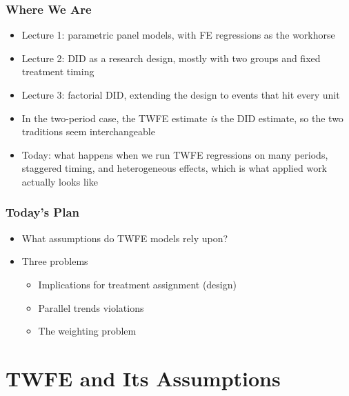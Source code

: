 \documentclass[xcolor=svgnames,9pt,english, aspectratio=169]{beamer}
\begin{document}
\begin{frame}
  \frametitle{Where We Are}
\begin{itemize}[<+->]\itemsep1em
\item Lecture 1: parametric panel models, with FE regressions as the workhorse
\item Lecture 2: DID as a research design, mostly with two groups and fixed treatment timing
\item Lecture 3: factorial DID, extending the design to events that hit every unit
\item In the two-period case, the TWFE estimate \emph{is} the DID estimate, so the two traditions seem interchangeable
\item Today: what happens when we run TWFE regressions on \alert{many periods}, \alert{staggered timing}, and \alert{heterogeneous effects}, which is what applied work actually looks like
\end{itemize}
\end{frame}

\begin{frame}
  \frametitle{Today's Plan}
\begin{itemize}\itemsep1.5em
\item What assumptions do TWFE models rely upon?
\item Three problems
\begin{itemize}
\item Implications for treatment assignment (design)
\item Parallel trends violations
\item The weighting problem
\end{itemize}
\end{itemize}
\bigskip\pause
{}
\end{frame}

\section{TWFE and Its Assumptions}
\end{document}
